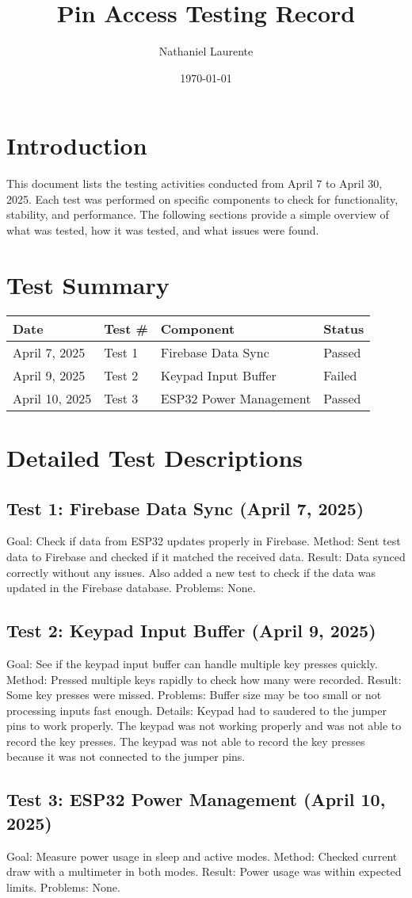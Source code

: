 \documentclass{article}
\title{Pin Access Testing Record}
\author{Nathaniel Laurente}
\date{\today}
\begin{document}
\maketitle

\section*{Introduction}
This document lists the testing activities conducted from April 7 to April 30, 2025. Each test was performed on specific components to check for functionality, stability, and performance. The following sections provide a simple overview of what was tested, how it was tested, and what issues were found.

\section*{Test Summary}
\begin{tabular}{| l | l | l | l |}
\hline
\textbf{Date} & \textbf{Test \#} & \textbf{Component} & \textbf{Status} \\
\hline
April 7, 2025 & Test 1 & Firebase Data Sync & Passed \\
April 9, 2025 & Test 2 & Keypad Input Buffer & Failed \\
April 10, 2025 & Test 3 & ESP32 Power Management & Passed \\


\hline
\end{tabular}

\section*{Detailed Test Descriptions}

\subsection*{Test 1: Firebase Data Sync (April 7, 2025)}
Goal: Check if data from ESP32 updates properly in Firebase.
Method: Sent test data to Firebase and checked if it matched the received data.
Result: Data synced correctly without any issues. Also added a new test to check if the data was updated in the Firebase database.
Problems: None.

\subsection*{Test 2: Keypad Input Buffer (April 9, 2025)}
Goal: See if the keypad input buffer can handle multiple key presses quickly.
Method: Pressed multiple keys rapidly to check how many were recorded.
Result: Some key presses were missed.
Problems: Buffer size may be too small or not processing inputs fast enough.
Details: Keypad had to saudered to the jumper pins to work properly. The keypad was not working properly and was not able to record the key presses. The keypad was not able to record the key presses because it was not connected to the jumper pins. 

\subsection*{Test 3: ESP32 Power Management (April 10, 2025)}
Goal: Measure power usage in sleep and active modes.
Method: Checked current draw with a multimeter in both modes.
Result: Power usage was within expected limits.
Problems: None.
\end{document}
